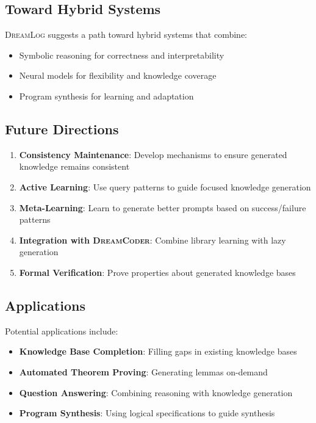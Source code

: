\documentclass[11pt,a4paper]{article}
\newcommand{\dreamlog}{\textsc{DreamLog}}
\newcommand{\dreamcoder}{\textsc{DreamCoder}}
\begin{document}
\subsection{Toward Hybrid Systems}

\dreamlog{} suggests a path toward hybrid systems that combine:
\begin{itemize}
\item Symbolic reasoning for correctness and interpretability
\item Neural models for flexibility and knowledge coverage
\item Program synthesis for learning and adaptation
\end{itemize}

\subsection{Future Directions}

\begin{enumerate}
\item \textbf{Consistency Maintenance}: Develop mechanisms to ensure generated knowledge remains consistent
\item \textbf{Active Learning}: Use query patterns to guide focused knowledge generation
\item \textbf{Meta-Learning}: Learn to generate better prompts based on success/failure patterns
\item \textbf{Integration with \dreamcoder{}}: Combine library learning with lazy generation
\item \textbf{Formal Verification}: Prove properties about generated knowledge bases
\end{enumerate}

\subsection{Applications}

Potential applications include:
\begin{itemize}
\item \textbf{Knowledge Base Completion}: Filling gaps in existing knowledge bases
\item \textbf{Automated Theorem Proving}: Generating lemmas on-demand
\item \textbf{Question Answering}: Combining reasoning with knowledge generation
\item \textbf{Program Synthesis}: Using logical specifications to guide synthesis
\end{itemize}
\end{document}
